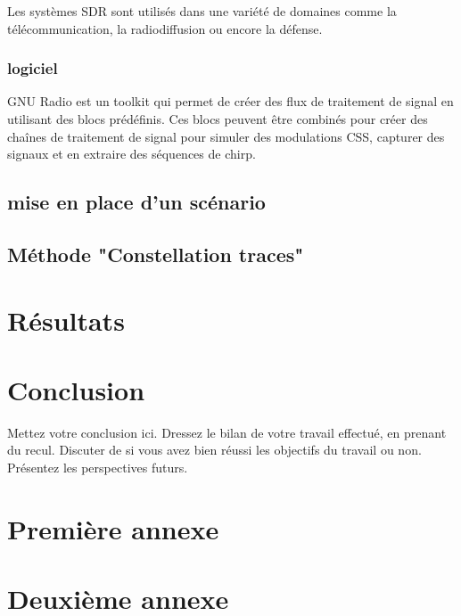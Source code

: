 \documentclass[12pt,a4paper,oneside, titlepage]{report}
\begin{document}
Les systèmes SDR sont utilisés dans une variété de domaines comme  la télécommunication, la radiodiffusion ou encore la défense.


\subsection{logiciel}

GNU Radio est un toolkit qui permet de créer des flux de traitement de signal en utilisant des blocs prédéfinis. Ces blocs peuvent être combinés pour créer des chaînes de traitement de signal pour simuler des modulations CSS, capturer des signaux et en extraire des séquences de chirp.

\section{mise en place d'un scénario}

\section{Méthode "Constellation traces"}

\chapter{Résultats}





\chapter*{Conclusion}
\renewcommand{\leftmark}{CONCLUSION}

Mettez votre conclusion ici.  Dressez le bilan de votre travail effectué, en prenant du recul. Discuter de si vous avez bien réussi les objectifs du travail ou non. Présentez les perspectives futurs.






\newpage
\appendix
{}

\chapter{Premi\`ere annexe}
\renewcommand{\leftmark}{ANNEXE \thechapter.~~Premi\`ere annexe}
\label{annexe1}

\chapter{Deuxi\`eme annexe}
\renewcommand{\leftmark}{ANNEXE \thechapter.~~Deuxi\`eme annexe}
\label{annexe2}

\end{document}
